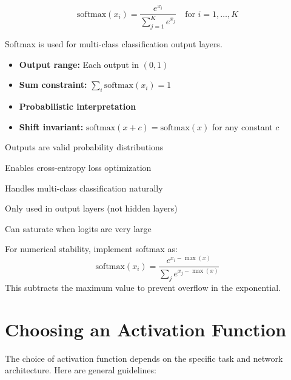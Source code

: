 \begin{equation}
\text{softmax}(x_i) = \frac{e^{x_i}}{\sum_{j=1}^{K} e^{x_j}} \quad \text{for } i = 1, \ldots, K
\end{equation}

Softmax is used for multi-class classification output layers.

\begin{properties}
\begin{itemize}
    \item \textbf{Output range:} Each output in $(0, 1)$
    \item \textbf{Sum constraint:} $\sum_i \text{softmax}(x_i) = 1$
    \item \textbf{Probabilistic interpretation}
    \item \textbf{Shift invariant:} $\text{softmax}(x + c) = \text{softmax}(x)$ for any constant $c$
\end{itemize}
\end{properties}

\begin{advantages}
    \item Outputs are valid probability distributions
    \item Enables cross-entropy loss optimization
    \item Handles multi-class classification naturally
\end{advantages}

\begin{disadvantages}
    \item Only used in output layers (not hidden layers)
    \item Can saturate when logits are very large
\end{disadvantages}

\begin{note}
For numerical stability, implement softmax as:
\begin{equation}
\text{softmax}(x_i) = \frac{e^{x_i - \max(x)}}{\sum_j e^{x_j - \max(x)}}
\end{equation}
This subtracts the maximum value to prevent overflow in the exponential.
\end{note}

\section{Choosing an Activation Function}

The choice of activation function depends on the specific task and network architecture. Here are general guidelines:

